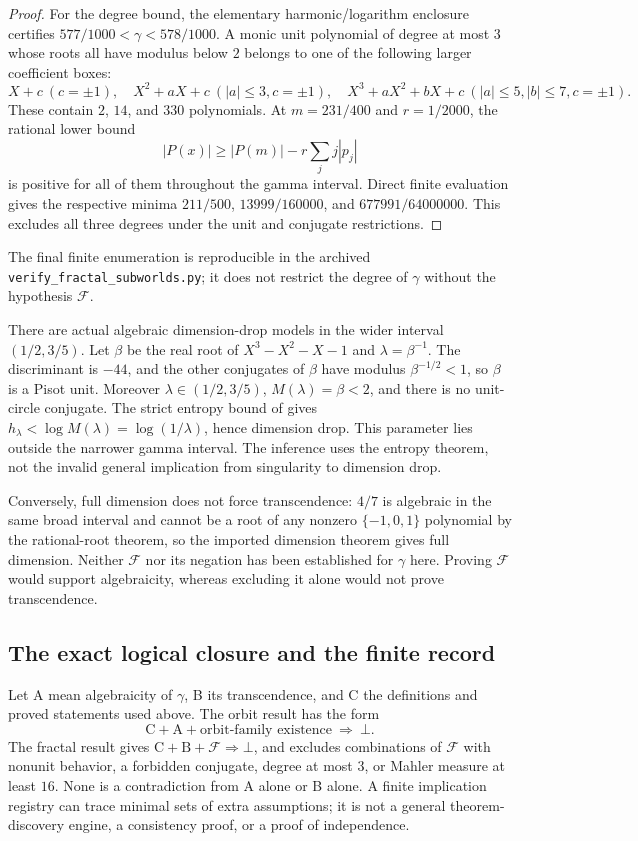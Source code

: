 \documentclass[11pt,a4paper]{article}
\theoremstyle{definition}
\theoremstyle{remark}
\numberwithin{equation}{section}
\begin{document}
\begin{proof}
For the degree bound, the elementary harmonic/logarithm enclosure certifies $577/1000<\gamma<578/1000$. A monic unit polynomial of degree at most $3$ whose roots all have modulus below $2$ belongs to one of the following larger coefficient boxes:
\[
 X+c\ (c=\pm1),\quad X^2+aX+c\ (|a|\le3,c=\pm1),\quad
 X^3+aX^2+bX+c\ (|a|\le5,|b|\le7,c=\pm1).
\]
These contain $2$, $14$, and $330$ polynomials. At $m=231/400$ and $r=1/2000$, the rational lower bound
\[
 |P(x)|\ge|P(m)|-r\sum_jj|p_j|
\]
is positive for all of them throughout the gamma interval. Direct finite evaluation gives the respective minima $211/500$, $13999/160000$, and $677991/64000000$. This excludes all three degrees under the unit and conjugate restrictions.
\end{proof}
The final finite enumeration is reproducible in the archived \texttt{verify\_fractal\_subworlds.py}; it does not restrict the degree of $\gamma$ without the hypothesis $\mathcal F$.

There are actual algebraic dimension-drop models in the wider interval $(1/2,3/5)$. Let $\beta$ be the real root of $X^3-X^2-X-1$ and $\lambda=\beta^{-1}$. The discriminant is $-44$, and the other conjugates of $\beta$ have modulus $\beta^{-1/2}<1$, so $\beta$ is a Pisot unit. Moreover $\lambda\in(1/2,3/5)$, $M(\lambda)=\beta<2$, and there is no unit-circle conjugate. The strict entropy bound of \cite[Proposition 7]{inf:BV} gives $h_\lambda<\log M(\lambda)=\log(1/\lambda)$, hence dimension drop. This parameter lies outside the narrower gamma interval. The inference uses the entropy theorem, not the invalid general implication from singularity to dimension drop.

Conversely, full dimension does not force transcendence: $4/7$ is algebraic in the same broad interval and cannot be a root of any nonzero $\{-1,0,1\}$ polynomial by the rational-root theorem, so the imported dimension theorem gives full dimension. Neither $\mathcal F$ nor its negation has been established for $\gamma$ here. Proving $\mathcal F$ would support algebraicity, whereas excluding it alone would not prove transcendence.

\subsection{The exact logical closure and the finite record}
\label{inf:sub:status}
Let A mean algebraicity of $\gamma$, B its transcendence, and C the definitions and proved statements used above. The orbit result has the form
\[
 \mathrm C+\mathrm A+\text{orbit-family existence}\ \Longrightarrow\ \bot.
\]
The fractal result gives $\mathrm C+\mathrm B+\mathcal F\Longrightarrow\bot$, and excludes combinations of $\mathcal F$ with nonunit behavior, a forbidden conjugate, degree at most $3$, or Mahler measure at least $16$. None is a contradiction from A alone or B alone. A finite implication registry can trace minimal sets of extra assumptions; it is not a general theorem-discovery engine, a consistency proof, or a proof of independence.
\end{document}
